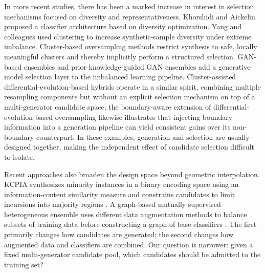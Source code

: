 \documentclass[pdflatex]{sn-jnl}
\begin{document}
In more recent studies, there has been a marked increase in interest in selection mechanisms focused on diversity and representativeness. Khorshidi and Aickelin \cite{ref33} proposed a classifier architecture based on diversity optimization. Yang and colleagues \cite{ref34} used clustering to increase synthetic-sample diversity under extreme imbalance. Cluster-based oversampling methods \cite{ref25} \cite{ref26} \cite{ref27} restrict synthesis to safe, locally meaningful clusters and thereby implicitly perform a structured selection. GAN-based ensembles \cite{ref37} and prior-knowledge-guided GAN ensembles \cite{ref38} add a generative-model selection layer to the imbalanced learning pipeline. Cluster-assisted differential-evolution-based hybrids \cite{ref39} operate in a similar spirit, combining multiple resampling components but without an explicit selection mechanism on top of a multi-generator candidate space; the boundary-aware extension of differential-evolution-based oversampling \cite{ref40} likewise illustrates that injecting boundary information into a generation pipeline can yield consistent gains over its non-boundary counterpart. In these examples, generation and selection are usually designed together, making the independent effect of candidate selection difficult to isolate.

Recent approaches also broaden the design space beyond geometric interpolation. KCPIA synthesizes minority instances in a binary encoding space using an information-content similarity measure and constrains candidates to limit incursions into majority regions \cite{ref50}. A graph-based mutually supervised heterogeneous ensemble uses different data augmentation methods to balance subsets of training data before constructing a graph of base classifiers \cite{ref51}. The first primarily changes how candidates are generated; the second changes how augmented data and classifiers are combined. Our question is narrower: given a fixed multi-generator candidate pool, which candidates should be admitted to the training set?
\end{document}
